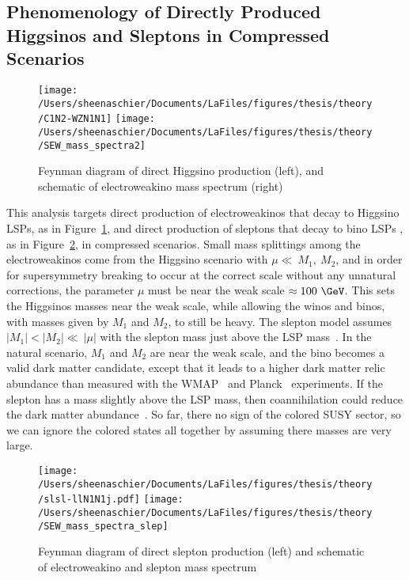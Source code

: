 \subsection{Phenomenology of Directly Produced Higgsinos and Sleptons in Compressed Scenarios}
\label{sec:pheno}
 \begin{figure}%
  \begin{center}
  \texttt{[image: /Users/sheenaschier/Documents/LaFiles/figures/thesis/theory/C1N2-WZN1N1]}
  \texttt{[image: /Users/sheenaschier/Documents/LaFiles/figures/thesis/theory/SEW\_mass\_spectra2]}
   \end{center}
 \caption{Feynman diagram of direct Higgsino production (left), and schematic of electroweakino mass spectrum (right)}
 \label{fig:fn1}
 \end{figure}
This analysis targets direct production of electroweakinos that decay to  Higgsino LSPs, as in Figure~\ref{fig:fn1}, and direct production of sleptons that decay to bino LSPs , as in Figure~\ref{fig:fn2}, in compressed scenarios.  Small mass splittings among the electroweakinos come from the Higgsino scenario with $\mu\ll~M_1,~M_2$, and in order for supersymmetry breaking to occur at the correct scale without any unnatural corrections, the parameter $\mu$ must be near the weak scale $\approx 100~\GeV$.  This sets the Higgsinos masses near the weak scale, while allowing the winos and binos, with masses given by $M_1$ and $M_2$, to still be heavy.  The slepton model assumes $|M_1| <|M_2|\ll~|\mu|$ with the slepton mass just above the LSP mass~\cite{gondolo}.  In the natural scenario, $M_1$ and $M_2$ are near the weak scale, and the bino becomes a valid dark matter candidate, except that it leads to a higher dark matter relic abundance than measured with the WMAP~\cite{Steigman:2012nb} and Planck~\cite{Busoni:2014gta} experiments.  If the slepton has a mass slightly above the LSP mass, then coannihilation could reduce the dark matter abundance~\cite{seckel}.  So far, there no sign of the colored SUSY sector, so we can ignore the colored states all together by assuming there masses are very large.  
   \begin{figure}%
  \begin{center}
  \texttt{[image: /Users/sheenaschier/Documents/LaFiles/figures/thesis/theory/slsl-llN1N1j.pdf]}
   \texttt{[image: /Users/sheenaschier/Documents/LaFiles/figures/thesis/theory/SEW\_mass\_spectra\_slep]}
   \end{center}
 \caption{Feynman diagram of direct slepton production (left) and schematic of electroweakino and slepton mass spectrum}
 \label{fig:fn2}
  \end{figure}


